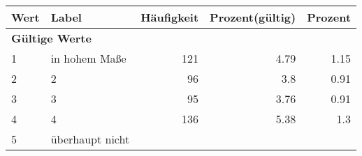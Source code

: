      \begin{longtable}{lXrrr}
     \toprule
     \textbf{Wert} & \textbf{Label} & \textbf{Häufigkeit} & \textbf{Prozent(gültig)} & \textbf{Prozent} \\
     \endhead
     \midrule
     \multicolumn{5}{l}{\textbf{Gültige Werte}}\\

     1 &
     \multicolumn{1}{X}{ in hohem Maße   } &


       \num{121} &
       \num[round-mode=places,round-precision=2]{4.79} &
         \num[round-mode=places,round-precision=2]{1.15} \\

     2 &
     \multicolumn{1}{X}{ 2   } &


       \num{96} &
       \num[round-mode=places,round-precision=2]{3.8} &
         \num[round-mode=places,round-precision=2]{0.91} \\

     3 &
     \multicolumn{1}{X}{ 3   } &


       \num{95} &
       \num[round-mode=places,round-precision=2]{3.76} &
         \num[round-mode=places,round-precision=2]{0.91} \\

     4 &
     \multicolumn{1}{X}{ 4   } &


       \num{136} &
       \num[round-mode=places,round-precision=2]{5.38} &
         \num[round-mode=places,round-precision=2]{1.3} \\

     5 &
     \multicolumn{1}{X}{ überhaupt nicht   } &



\end{longtable}
